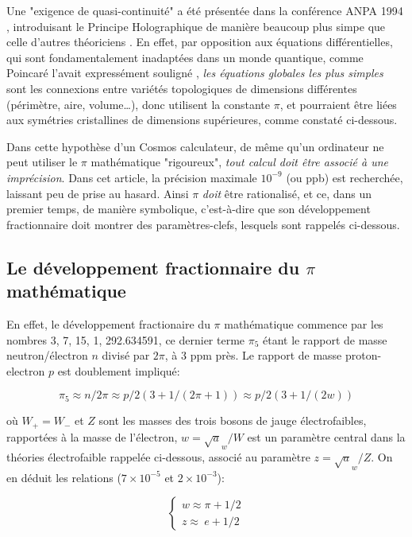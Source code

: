 \documentclass[a4paper,9pt]{article}
\begin{document}
Une "exigence de quasi-continuité" a été présentée dans la conférence ANPA 1994 \cite{Sanchez1}, introduisant le Principe Holographique de manière beaucoup plus simpe que celle d'autres théoriciens \cite{Hooft}. En effet, par opposition aux équations différentielles, qui sont fondamentalement inadaptées dans un monde quantique, comme Poincaré l'avait expressément souligné \cite{Poincare1}, \textit{les équations globales les plus simples} sont les connexions entre variétés topologiques de dimensions différentes (périmètre, aire, volume…), donc utilisent la constante $\pi$, et pourraient être liées aux symétries cristallines de dimensions supérieures, comme constaté ci-dessous.  

Dans cette hypothèse d’un Cosmos calculateur, de même qu’un ordinateur ne peut utiliser le $\pi$ mathématique "rigoureux", \textit {tout calcul doit être associé à une imprécision}. Dans cet article, la précision maximale $10^{-9}$ (ou ppb) est recherchée, laissant peu de prise au hasard. Ainsi $\pi$ \textit {doit} être rationalisé, et ce, dans un premier temps, de manière symbolique, c’est-à-dire que son développement fractionnaire doit montrer des paramètres-clefs, lesquels sont rappelés ci-dessous.

\subsection{Le développement fractionnaire du $\pi$ mathématique}
En effet, le développement fractionaire du $\pi$ mathématique commence par les nombres 3, 7, 15, 1, 292.634591, ce dernier terme $\pi_5$ étant le rapport de masse neutron/électron $n$ divisé par $2\pi$, à 3 ppm près. Le rapport de masse proton-electron $p$ est doublement impliqué:

\begin{equation}
 \pi_5 \approx n/2\pi \approx p/2(3+1/(2\pi+1)) \approx p/2(3+1/(2w))
 \end{equation}
 
où $W_+ =  W_-$ et $Z$ sont les masses des trois bosons de jauge électrofaibles, rapportées à la masse de l'électron, $w = \sqrt a_w/W$ est un paramètre central dans la théories électrofaible rappelée ci-dessous, associé au paramètre $z = \sqrt a_w/Z$. On en déduit les relations ($7 \times 10^{-5}$ et $2 \times 10^{-3}$):
 
 
 \begin{equation}
 \left\{
    \begin{array}{ll}
        w \approx \pi + 1/2 \\
        z \approx ~ e + 1/2
    \end{array}
\right.
\end{equation}
 
\end{document}
